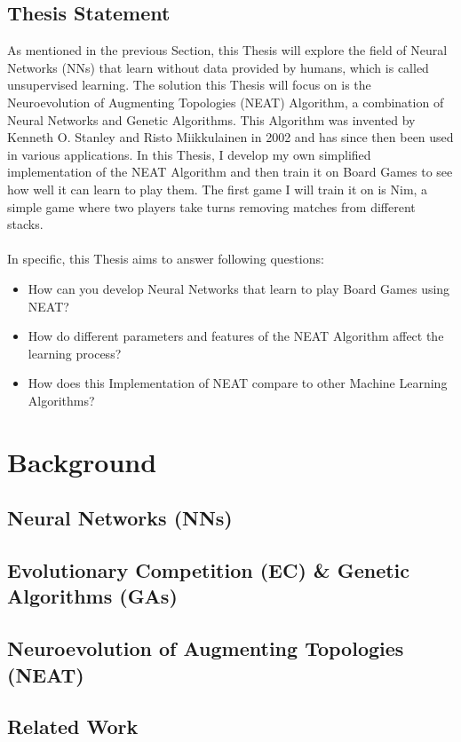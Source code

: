 \documentclass[11pt, a4paper]{report}
\begin{document}
        \section{Thesis Statement}
    As mentioned in the previous Section, this Thesis will explore the field of Neural Networks (NNs) that learn without data provided by humans, which is called unsupervised learning.
    The solution this Thesis will focus on is the Neuroevolution of Augmenting Topologies (NEAT) Algorithm, a combination of Neural Networks and Genetic Algorithms.
    This Algorithm was invented by Kenneth O. Stanley and Risto Miikkulainen in 2002 and has since then been used in various applications.
    In this Thesis, I develop my own simplified implementation of the NEAT Algorithm and then train it on Board Games to see how well it can learn to play them.
    The first game I will train it on is Nim, a simple game where two players take turns removing matches from different stacks.
    \\ \\ In specific, this Thesis aims to answer following questions:
    \begin{itemize}
        \item How can you develop Neural Networks that learn to play Board Games using NEAT?
        \item How do different parameters and features of the NEAT Algorithm affect the learning process?
        \item How does this Implementation of NEAT compare to other Machine Learning Algorithms?
    \end{itemize}
    \chapter{Background}
        \section{Neural Networks (NNs)}
        \section{Evolutionary Competition (EC) \& Genetic Algorithms (GAs)}
        \section{Neuroevolution of Augmenting Topologies (NEAT)}
        \section{Related Work}
\end{document}
